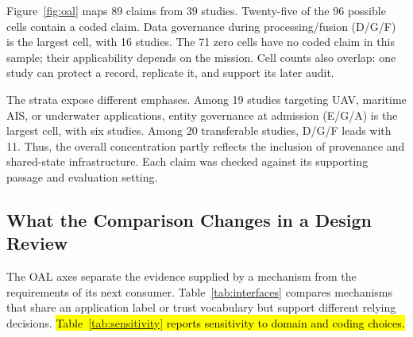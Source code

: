 \documentclass[blockchains,review,accept,moreauthors]{Definitions/mdpi}
\begin{document}
Figure~\ref{fig:oal} maps 89 claims from 39 studies. Twenty-five of the 96 possible cells contain a coded claim. Data governance during processing/fusion (D/G/F) is the largest cell, with 16 studies. The 71 zero cells have no coded claim in this sample; their applicability depends on the mission. Cell counts also overlap: one study can protect a record, replicate it, and support its later audit.

The strata expose different emphases. Among 19 studies targeting UAV, maritime AIS, or underwater applications, entity governance at admission (E/G/A) is the largest cell, with six studies. Among 20 transferable studies, D/G/F leads with 11. Thus, the overall concentration partly reflects the inclusion of provenance and shared-state infrastructure. Each claim was checked against its supporting passage and evaluation setting.




\subsection{What the Comparison Changes in a Design Review}\label{sec:comparative}

The OAL axes separate the evidence supplied by a mechanism from the requirements of its next consumer. Table~\ref{tab:interfaces} compares mechanisms that share an application label or trust vocabulary but support different relying decisions. \hl{Table~{\ref{tab:sensitivity}} reports sensitivity to domain and coding choices.}
\end{document}
